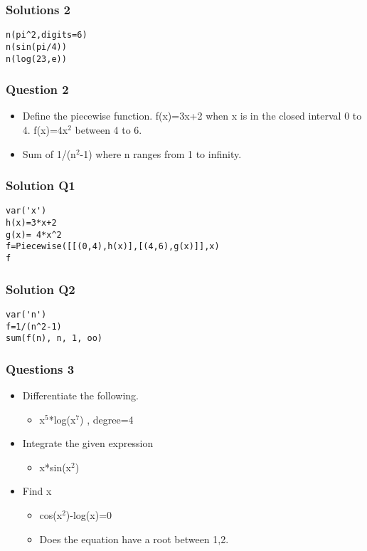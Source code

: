 \documentclass[presentation]{beamer}
\begin{document}
\begin{frame}[fragile]
\frametitle{Solutions 2}
\label{sec-5}

\begin{verbatim}
n(pi^2,digits=6)
n(sin(pi/4))
n(log(23,e))
\end{verbatim}
\end{frame}
\begin{frame}
\frametitle{Question 2}
\label{sec-6}

\begin{itemize}
\item Define the piecewise function. 
   f(x)=3x+2 
   when x is in the closed interval 0 to 4.
   f(x)=4x$^2$
   between 4 to 6.
\item Sum  of 1/(n$^2$-1) where n ranges from 1 to infinity.
\end{itemize}
\end{frame}
\begin{frame}[fragile]
\frametitle{Solution Q1}
\label{sec-7}

\begin{verbatim}
var('x') 
h(x)=3*x+2 
g(x)= 4*x^2
f=Piecewise([[(0,4),h(x)],[(4,6),g(x)]],x)
f
\end{verbatim}
\end{frame}
\begin{frame}[fragile]
\frametitle{Solution Q2}
\label{sec-8}

\begin{verbatim}
var('n')
f=1/(n^2-1) 
sum(f(n), n, 1, oo)
\end{verbatim}
 
\end{frame}
\begin{frame}
\frametitle{Questions 3}
\label{sec-9}

\begin{itemize}
\item Differentiate the following.

\begin{itemize}
\item x$^5$*log(x$^7$)  , degree=4
\end{itemize}

\item Integrate the given expression

\begin{itemize}
\item x*sin(x$^2$)
\end{itemize}

\item Find x

\begin{itemize}
\item cos(x$^2$)-log(x)=0
\item Does the equation have a root between 1,2.
\end{itemize}

\end{itemize}
\end{frame}
\end{document}

